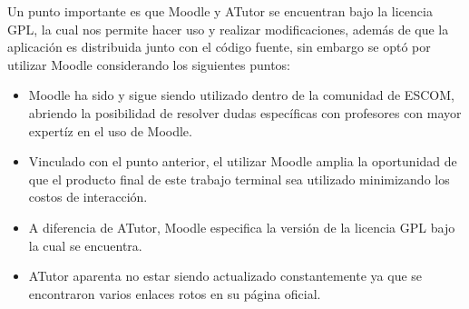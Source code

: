  \noindent Un punto importante es que Moodle y ATutor se encuentran bajo la licencia GPL,
 la cual nos permite hacer uso y realizar modificaciones, además de que la aplicación es
 distribuida junto con el código fuente, sin embargo se optó por utilizar Moodle considerando
 los siguientes puntos:

    \begin{itemize}
        \item Moodle ha sido y sigue siendo utilizado dentro de la comunidad de ESCOM,
              abriendo la posibilidad de resolver dudas específicas con profesores con
              mayor expertíz en el uso de Moodle.

        \item Vinculado con el punto anterior, el utilizar Moodle amplia la oportunidad
              de que el producto final de este trabajo terminal sea utilizado minimizando
              los costos de interacción.

        \item A diferencia de ATutor, Moodle especifica la versión de la licencia GPL
              bajo la cual se encuentra.

        \item ATutor aparenta no estar siendo actualizado constantemente ya que se
              encontraron varios enlaces rotos en su página oficial.
    \end{itemize}






